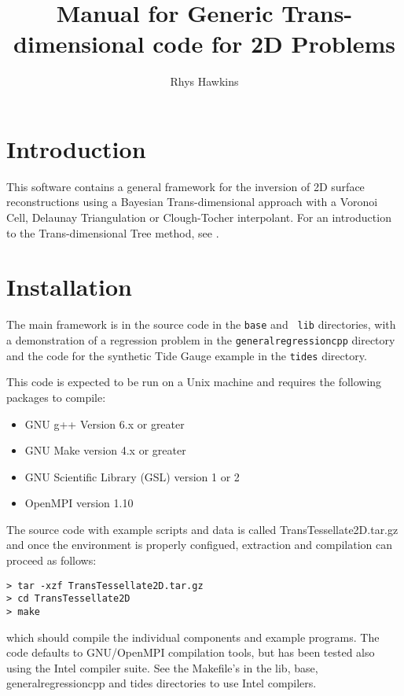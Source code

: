 \documentclass[a4paper,12pt]{article}
\begin{document}
\title{Manual for Generic Trans-dimensional code for 2D Problems}
\author{Rhys Hawkins}

\maketitle

\tableofcontents

\section{Introduction}

This software contains a general framework for the inversion of 2D
surface reconstructions using a Bayesian Trans-dimensional approach
with a Voronoi Cell, Delaunay Triangulation or Clough-Tocher
interpolant.  For an introduction to the Trans-dimensional Tree
method, see \citet{Hawkins:2018:B}.

\section{Installation}

The main framework is in the source code in the {\tt base} and {\tt
  lib} directories, with a demonstration of a regression problem in
the {\tt generalregressioncpp} directory and the code for the
synthetic Tide Gauge example in the {\tt tides} directory.

This code is expected to be run on a Unix machine and requires the
following packages to compile:

\begin{itemize}
\item GNU g++ Version 6.x or greater
\item GNU Make version 4.x or greater
\item GNU Scientific Library (GSL) version 1 or 2
\item OpenMPI version 1.10
\end{itemize}

The source code with example scripts and data is called
TransTessellate2D.tar.gz and once the environment is properly
configued, extraction and compilation can proceed as follows:

\begin{verbatim}
> tar -xzf TransTessellate2D.tar.gz
> cd TransTessellate2D
> make 
\end{verbatim}

which should compile the individual components and example programs.
The code defaults to GNU/OpenMPI compilation tools, but has been
tested also using the Intel compiler suite. See the Makefile's in
the lib, base, generalregressioncpp and tides directories to use
Intel compilers.
\end{document}
